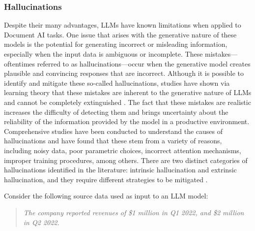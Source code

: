 \documentclass[english, 12pt, a4paper, elec, utf8, a-2b, online]{aaltothesis}
\begin{document}
\subsubsection{Hallucinations}

Despite their many advantages, \ac{LLM}s have known limitations when applied to Document \ac{AI} tasks.
One issue that arises with the generative nature of these models is the potential for generating incorrect or misleading information, especially when the input data is ambiguous or incomplete.
These mistakes—oftentimes referred to as hallucinations—occur when the generative model creates plausible and convincing responses that are incorrect.
Although it is possible to identify and mitigate these so-called hallucinations, studies have shown via learning theory that these mistakes are inherent to the generative nature of \ac{LLM}s and cannot be completely extinguished \cite{xu2024hallucination}.
The fact that these mistakes are realistic increases the difficulty of detecting them and brings uncertainty about the reliability of the information provided by the model in a productive environment.
Comprehensive studies have been conducted to understand the causes of hallucinations and have found that these stem from a variety of reasons, including noisy data, poor parametric choices, incorrect attention mechanisms, improper training procedures, among others.
There are two distinct categories of hallucinations identified in the literature: intrinsic hallucination and extrinsic hallucination, and they require different strategies to be mitigated \cite{survey_hallucination_natural_language_generation}.

Consider the following source data used as input to an \ac{LLM} model:

\begin{quote}
    \textit{The company reported revenues of \$1 million in Q1 2022, and \$2 million in Q2 2022.}
\end{quote}
\end{document}
